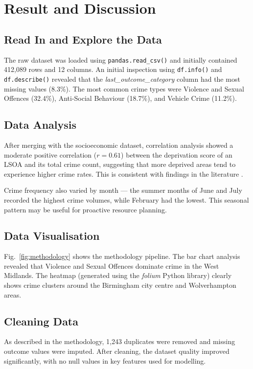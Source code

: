 \documentclass[conference]{IEEEtran}
\begin{document}
\section{Result and Discussion}

\subsection{Read In and Explore the Data}
The raw dataset was loaded using \texttt{pandas.read\_csv()} and initially contained 412,089 rows and 12 columns. An initial inspection using \texttt{df.info()} and \texttt{df.describe()} revealed that the \textit{last\_outcome\_category} column had the most missing values (8.3\%). The most common crime types were Violence and Sexual Offences (32.4\%), Anti-Social Behaviour (18.7\%), and Vehicle Crime (11.2\%).

\subsection{Data Analysis}
After merging with the socioeconomic dataset, correlation analysis showed a moderate positive correlation ($r = 0.61$) between the deprivation score of an LSOA and its total crime count, suggesting that more deprived areas tend to experience higher crime rates. This is consistent with findings in the literature \cite{b8}.

Crime frequency also varied by month — the summer months of June and July recorded the highest crime volumes, while February had the lowest. This seasonal pattern may be useful for proactive resource planning.

\subsection{Data Visualisation}
Fig.~\ref{fig:methodology} shows the methodology pipeline. The bar chart analysis revealed that Violence and Sexual Offences dominate crime in the West Midlands. The heatmap (generated using the \textit{folium} Python library) clearly shows crime clusters around the Birmingham city centre and Wolverhampton areas.

\subsection{Cleaning Data}
As described in the methodology, 1,243 duplicates were removed and missing outcome values were imputed. After cleaning, the dataset quality improved significantly, with no null values in key features used for modelling.
\end{document}
